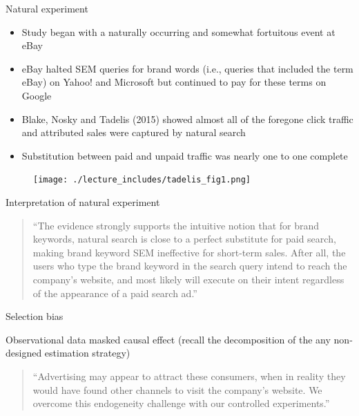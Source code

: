 \documentclass{beamer}
\begin{document}
\begin{frame}{Natural experiment}

\begin{itemize}
\item Study began with a naturally occurring and somewhat fortuitous  event at eBay
\item eBay halted SEM queries for brand words (i.e., queries that included the term eBay) on Yahoo! and Microsoft but continued to pay for these terms on Google
\item Blake, Nosky and Tadelis (2015) showed almost all of the foregone click traffic and attributed sales were captured by natural search
\item Substitution between paid and unpaid traffic was nearly one to one complete
\end{itemize}

\end{frame}


\begin{frame}

\begin{figure}
\begin{center}
\texttt{[image: ./lecture\_includes/tadelis\_fig1.png]}
\end{center}
\end{figure}

\end{frame}

\begin{frame}{Interpretation of natural experiment}

\begin{quote}
``The evidence strongly supports the intuitive notion that for brand keywords, natural search is close to a perfect substitute for paid search, making brand keyword SEM ineffective for short-term sales.  After all, the users who type the brand keyword in the search query intend to reach the company's website, and most likely will execute on their intent regardless of the appearance of a paid search ad.''
\end{quote}

\end{frame}

\begin{frame}{Selection bias}

Observational data masked causal effect (recall the decomposition of the any non-designed estimation strategy)

\bigskip

\begin{quote}
``Advertising may appear to attract these consumers, when in reality they would have found other channels to visit the company's website.  We overcome this endogeneity challenge with our controlled experiments.''
\end{quote}

\end{frame}
\end{document}
